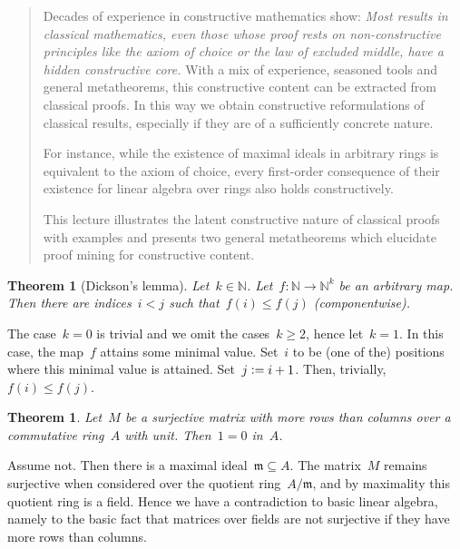 \documentclass[10pt,reqno,a4paper,openany]{amsbook}
\makeatletter
\theoremstyle{definition}
\theoremstyle{plain}
\newtheorem{thm}[defn]{Theorem}
\theoremstyle{remark}
\newcommand{\NN}{\mathbb{N}}
\newcommand{\mmm}{\mathfrak{m}}
\newcommand{\?}{\,{:}\,}
\renewcommand{\_}{\mathpunct{.}\,}
\newcommand{\defeq}{\vcentcolon=}
\renewenvironment{proof}[1][\proofname]{\par
  \pushQED{\qed}%
  \normalfont \topsep6\p@\@plus6\p@\relax
  \trivlist
  \item[\hskip\labelsep
        \itshape
    #1\@addpunct{.}]\ignorespaces
}{%
  \popQED\endtrivlist\@endpefalse
}
\newenvironment{intro}{\begin{quote}}{\end{quote}\bigskip}
\makeatother
\begin{document}
\begin{intro}
Decades of experience in constructive mathematics show: \emph{Most results
in classical mathematics, even those whose proof rests on
non-constructive principles like the axiom of choice or the law of
excluded middle, have a hidden constructive core.} With a mix of
experience, seasoned tools and general metatheorems, this constructive
content can be extracted from classical proofs. In this way we obtain
constructive reformulations of classical results, especially
if they are of a sufficiently concrete nature.

For instance, while the existence of maximal ideals in arbitrary rings
is equivalent to the axiom of choice, every first-order consequence of
their existence for linear algebra over rings also holds constructively.

This lecture illustrates the latent constructive nature of classical
proofs with examples and presents two general metatheorems which
elucidate proof mining for constructive content.
\end{intro}

\begin{thm}[Dickson's lemma]\label{thm:dickson}
Let~$k \in \NN$. Let~$f : \NN \to \NN^k$ be an arbitrary map. Then there are
indices~$i < j$ such that~$f(i) \leq f(j)$ (componentwise).
\end{thm}

\begin{proof}[Proof (classical)]The case~$k = 0$ is trivial and we omit the cases~$k
\geq 2$, hence let~$k = 1$. In this case, the map~$f$ attains some minimal
value. Set~$i$ to be (one of the) positions where this minimal value is
attained. Set~$j \defeq i+1$. Then, trivially, $f(i) \leq f(j)$.
\end{proof}

\begin{thm}\label{thm:surjective-matrix}
Let~$M$ be a surjective matrix with more rows than columns over a commutative
ring~$A$ with unit. Then~$1 = 0$ in~$A$.
\end{thm}

\begin{proof}[Proof (classical)]Assume not. Then there is a maximal
ideal~$\mmm \subseteq A$. The matrix~$M$ remains surjective when considered over
the quotient ring~$A/\mmm$, and by maximality this quotient ring is a field.
Hence we have a contradiction to basic linear algebra, namely to the basic fact
that matrices over fields are not surjective if they have more rows than
columns.\end{proof}
\end{document}
